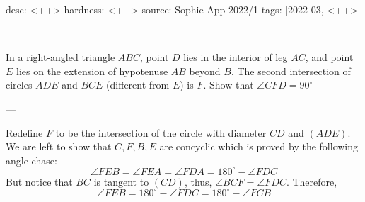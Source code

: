 desc: <++>
hardness: <++>
source: Sophie App 2022/1
tags: [2022-03, <++>]

---

In a right-angled triangle $ABC$, point $D$ lies in the interior of leg $AC$, and point $E$ lies on the extension of hypotenuse $AB$ beyond $B$. The second intersection of circles $ADE$ and $BCE$ (different from $E$) is $F$. Show that $\angle CFD = 90^\circ$

---

Redefine $F$ to be the intersection of the circle with diameter $CD$ and $(ADE)$. We are left to show that 
$C,F,B,E$ are concyclic which is proved by the following angle chase:
\[ \boxed{\angle FEB} = \angle FEA = \angle FDA = 180^\circ - \angle FDC \]
But notice that $BC$ is tangent to $(CD)$, thus, $\angle BCF = \angle FDC$. Therefore,
\[\boxed{\angle FEB} = 180^\circ - \angle FDC = 180^\circ - \boxed{\angle FCB}\]

